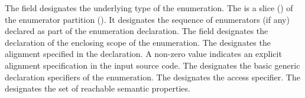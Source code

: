 The  field designates the underlying type of the enumeration.
The  is a slice () of the enumerator partition (). 
 It designates the sequence of enumerators (if any) declared as part
of the enumeration declaration.
The  field designates the declaration of the enclosing scope of the enumeration.
The  designates the alignment specified in the declaration.  A non-zero value indicates an explicit alignment specification
in the input source code.
The  designates the basic generic declaration specifiers of the enumeration.
The  designates the access specifier.
The  designates the set of reachable semantic properties.


\subsection{} 
\label{sec:ifc:DeclSort:Alias}

